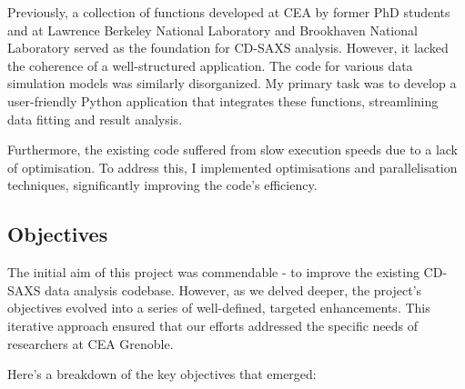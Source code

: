 \medskip

Previously, a collection of functions developed at CEA by former PhD students and at Lawrence Berkeley National Laboratory and Brookhaven National Laboratory served as the 
foundation for CD-SAXS analysis. However, it lacked the coherence of a well-structured application.
The code for various data simulation models was similarly disorganized. My primary task was to 
develop a user-friendly Python application that integrates these functions, streamlining data 
fitting and result analysis.

\medskip

Furthermore, the existing code suffered from slow execution speeds due to a lack of optimisation.
To address this, I implemented optimisations and parallelisation techniques, significantly 
improving the code's efficiency.

\medskip


\subsection{Objectives}

\medskip

The initial aim of this project was commendable - to improve the existing CD-SAXS data analysis 
codebase. However, as we delved deeper, the project's objectives evolved into a series of 
well-defined, targeted enhancements. This iterative approach ensured that our efforts addressed 
the specific needs of researchers at CEA Grenoble.

Here's a breakdown of the key objectives that emerged:

